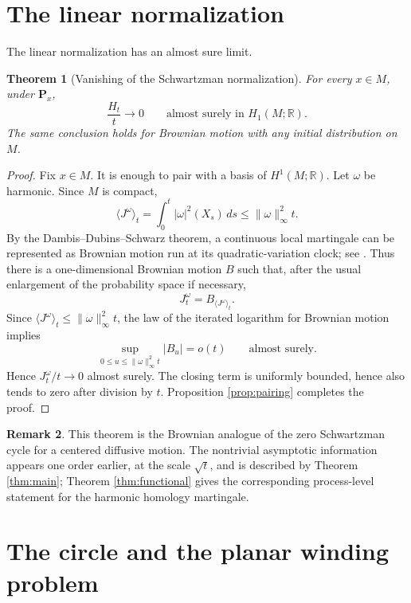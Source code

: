 \documentclass[a4paper,reqno]{amsart}
\newcommand{\R}{\mathbb R}
\newcommand{\Pp}{\mathbf P}
\newtheorem{theorem}{Theorem}[section]
\theoremstyle{definition}
\newtheorem{remark}[theorem]{Remark}
\begin{document}
\section{The linear normalization}

The linear normalization has an almost sure limit.

\begin{theorem}[Vanishing of the Schwartzman normalization]\label{thm:slln}
For every $x\in M$, under $\Pp_x$,
\[
   \frac{H_t}{t}\longrightarrow0
   \qquad\text{almost surely in }H_1(M;\R).
\]
The same conclusion holds for Brownian motion with any initial distribution on $M$.
\end{theorem}

\begin{proof}
Fix $x\in M$.  It is enough to pair with a basis of $H^1(M;\R)$.  Let $\omega$ be harmonic.  Since $M$ is compact,
\[
  \langle J^\omega\rangle_t
  =\int_0^t|\omega|^2(X_s)\,ds
  \le \|\omega\|_\infty^2 t.
\]
By the Dambis--Dubins--Schwarz theorem, a continuous local martingale can be represented as Brownian motion run at its quadratic-variation clock; see \cite[Chapter~V]{RevuzYor}.  Thus there is a one-dimensional Brownian motion $B$ such that, after the usual enlargement of the probability space if necessary,
\[
   J_t^\omega=B_{\langle J^\omega\rangle_t}.
\]
Since $\langle J^\omega\rangle_t\le \|\omega\|_\infty^2t$, the law of the iterated logarithm for Brownian motion \cite[Chapter~II]{RevuzYor} implies
\[
   \sup_{0\le u\le \|\omega\|_\infty^2t}|B_u|=o(t)
   \qquad\text{almost surely}.
\]
Hence $J_t^\omega/t\to0$ almost surely.  The closing term is uniformly bounded, hence also tends to zero after division by $t$.  Proposition \ref{prop:pairing} completes the proof.
\end{proof}

\begin{remark}
This theorem is the Brownian analogue of the zero Schwartzman cycle for a centered diffusive motion.  The nontrivial asymptotic information appears one order earlier, at the scale $\sqrt t$, and is described by Theorem \ref{thm:main}; Theorem \ref{thm:functional} gives the corresponding process-level statement for the harmonic homology martingale.
\end{remark}

\section{The circle and the planar winding problem}
\end{document}

